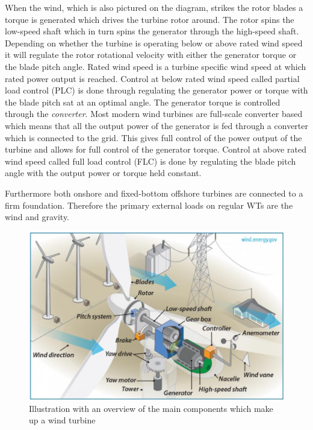 When the wind, which is also pictured on the diagram, strikes the rotor blades a torque is generated which drives the turbine rotor around. The rotor spins the low-speed shaft which in turn spins the generator through the high-speed shaft. Depending on whether the turbine is operating below or above rated wind speed it will regulate the rotor rotational velocity with either the generator torque or the blade pitch angle. Rated wind speed is a turbine specific wind speed at which rated power output is reached.
Control at below rated wind speed called partial load control (PLC) is done through regulating the generator power or torque with the blade pitch sat at an optimal angle. The generator torque is controlled through the \textit{converter}. Most modern wind turbines are full-scale converter based which means that all the output power of the generator is fed through a converter which is connected to the grid. This gives full control of the power output of the turbine and allows for full control of the generator torque. Control at above rated wind speed called full load control (FLC) is done by regulating the blade pitch angle with the output power or torque held constant.

Furthermore both onshore and fixed-bottom offshore turbines are connected to a firm foundation. Therefore the primary external loads on regular WTs are the wind and gravity.
\begin{figure}[ht]
	\centering
	\includegraphics[width=0.7\linewidth]{Graphics/WtComponents.png}
	\caption{Illustration with an overview of the main components which make up a wind turbine}
	\label{fig:wt_components}
\end{figure}


